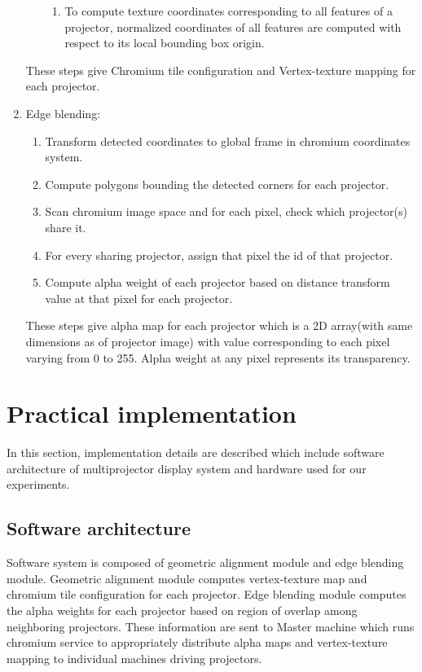 \documentclass{article}
\begin{document}
\begin{enumerate}
\begin{enumerate}
\begin{enumerate}
\item To compute texture coordinates corresponding to all features of a projector, normalized coordinates of all features are 	            computed with respect to its local bounding box origin.
\end{enumerate}
\end{enumerate}
These steps give Chromium tile configuration and Vertex-texture mapping for each projector.

\item Edge blending:
\begin{enumerate}
\item Transform detected coordinates to global frame in chromium coordinates system.
\item Compute polygons bounding the detected corners for each projector.
\item Scan chromium image space and for each pixel, check which projector(s) share it.
\item For every sharing projector, assign that pixel the id of that projector.
\item Compute alpha weight of each projector based on distance transform value at that pixel for each projector.
\end{enumerate}
These steps give alpha map for each projector which is a 2D array(with same dimensions as of projector image) with value corresponding to each pixel varying from 0 to 255. Alpha weight at any pixel represents its transparency.
\end{enumerate}




\section{Practical implementation}
In this section, implementation details are described which include software architecture of multiprojector display system and hardware used for our experiments.

\subsection{Software architecture}
Software system is composed of geometric alignment module and edge blending module. Geometric alignment module computes vertex-texture map and chromium tile configuration for each projector. Edge blending module computes the alpha weights for each projector based on region of overlap among neighboring projectors. These information are sent to Master machine which runs chromium service to appropriately distribute alpha maps and vertex-texture mapping to individual machines driving projectors.
\end{document}

